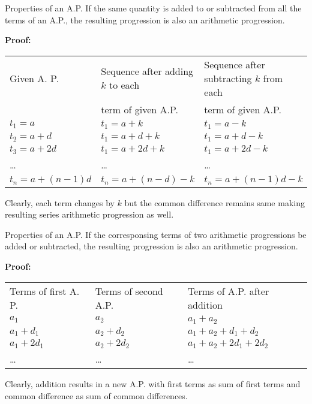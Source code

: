 \documentclass[aspectratio=1610,8pt]{beamer}
\begin{document}
\begin{frame}{Properties of an A.P.}
  If the same quantity is added to or subtracted from all the terms of an A.P.,
  the resulting progression is also an arithmetic progression.

  \textbf{Proof:}\\
  \begin{tabular}{lll}
    Given A. P. & Sequence after adding $k$ to each &
    Sequence after subtracting $k$ from each \\
    &term of given A.P.&term of given A.P.\\
    $t_1 = a$ & $t_1 = a + k$ & $t_1 = a - k$\\
    $t_2 = a + d$ & $t_1 = a + d + k$ & $t_1 = a + d - k$\\
    $t_3 = a + 2d$ & $t_1 = a + 2d + k$ & $t_1 = a + 2d - k$\\
    \ldots&\ldots & \ldots\\
    $t_n = a + (n - 1)d$ & $t_n = a + (n - d) - k$ & $t_n = a + (n - 1)d - k$
  \end{tabular}
  
  Clearly, each term changes by $k$ but the common difference remains same
  making resulting series arithmetic progression as well.
\end{frame}
\begin{frame}{Properties of an A.P.}
  If the corresponsing terms of two arithmetic progressions be added or
  subtracted, the resulting progression is also an arithmetic progression.

  \textbf{Proof:}\\
  \begin{tabular}{lll}
    Terms of first A. P.&Terms of second A.P.&Terms of A.P. after addition\\
    $a_1$&$a_2$&$a_1 + a_2$\\
    $a_1 + d_1$&$a_2 + d_2$&$a_1 + a_2 + d_1 + d_2$\\
    $a_1 + 2d_1$&$a_2 + 2d_2$&$a_1 + a_2 + 2d_1 + 2d_2$\\
    \ldots & \ldots & \ldots
  \end{tabular}

    Clearly, addition results in a new A.P. with first terms as sum of first
    terms and common difference as sum of common differences.
\end{frame}
\end{document}
